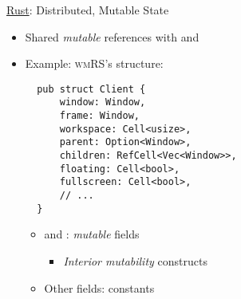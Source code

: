 \begin{frame}[fragile]{\underline{Rust}: Distributed, Mutable State \hfill {\footnotesize \currentname}}


    \begin{itemize}
            
        \item Shared \textit{mutable} references with \underline{} and \underline{}

        \item Example: \textsc{wmRS}'s  structure:\\[3pt]
\begin{verbatim}
  pub struct Client {
      window: Window,
      frame: Window,
      workspace: Cell<usize>,
      parent: Option<Window>,
      children: RefCell<Vec<Window>>,
      floating: Cell<bool>,
      fullscreen: Cell<bool>,
      // ...
  }
\end{verbatim}

    \vspace*{5pt}\begin{itemize}

        \item {} and : \textit{mutable} fields
            \begin{itemize}
                \item \textit{Interior mutability} constructs
            \end{itemize}

        \item Other fields:  constants

    \end{itemize}

    \end{itemize}

    \vfill

\end{frame}

